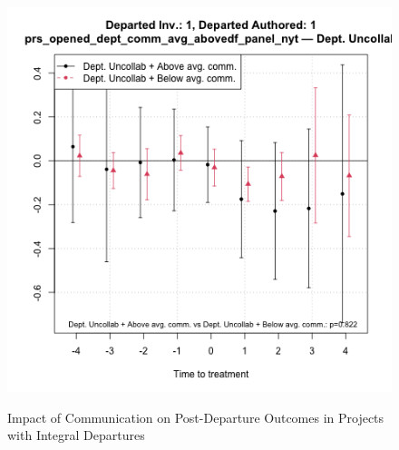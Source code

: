 \begin{figure}[htbp]
\begin{minipage}[b]{0.24\textwidth}
        \includegraphics[width=\textwidth]{temp/output/collab_imp/auth_n1_inv_n1_cs_norm_prs_opened_dept_comm_avg_above_Dept.Uncollab.png}
    \label{fig:prs_opened_comm_uncollab_comm_nonint}
    \end{minipage}
    \caption{Impact of Communication on Post-Departure Outcomes in Projects with Integral Departures}
    \label{fig:prs_opened_comm}
\end{figure}
